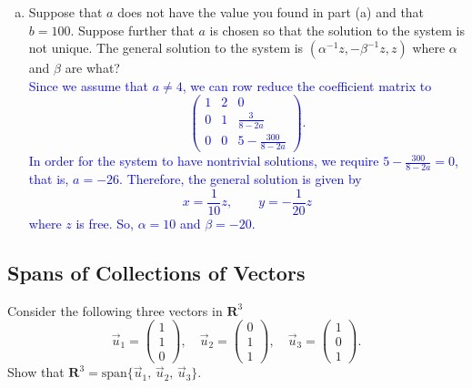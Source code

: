 \documentclass[a4paper,11pt]{article}
\newcommand{\R}{\mathbf{R}}
\newcommand{\BB}[1]{\textcolor{blue}{#1}}
\begin{document}
\begin{enumerate}[(a)]
\item Suppose that $a$ does not have the value you found in part (a) and that
  $b=100$. Suppose further that $a$ is chosen so that the solution to the system
  is not unique. The general solution to the system is
  $(\alpha^{-1}z,-\beta^{-1}z,z)$ where $\alpha$ and $\beta$ are what? \\

  \BB{Since we assume that $a \neq 4$, we can row reduce the coefficient matrix
    to
    \[
      \left(
        \begin{array}{rrr}
          1 & 2 & 0 \\
          0 & 1 & \frac{3}{8-2a} \\
          0 & 0 & 5-\frac{300}{8-2a}
        \end{array}
      \right).
    \]
    In order for the system to have nontrivial solutions, we require
    $5-\frac{300}{8-2a}=0$, that is, $a=-26$. Therefore, the general solution is
    given by
    \[
      x=\frac{1}{10}z, \qquad y=-\frac{1}{20}z
    \]
    where $z$ is free. So, $\alpha=10$ and $\beta=-20$. \\
  }
\end{enumerate}

\subsection*{Spans of Collections of Vectors}

 Consider the following three vectors in $\R^3$
\[
  \vec u_1 = \begin{pmatrix}1\\1\\0\end{pmatrix},\quad
  \vec u_2 = \begin{pmatrix}0\\1\\1\end{pmatrix},\quad
  \vec u_3 = \begin{pmatrix}1\\0\\1\end{pmatrix}.
\]
Show that $\R^3=\text{span}\{\vec u_1,\,\vec u_2,\,\vec u_3\}$. \\
\end{document}
